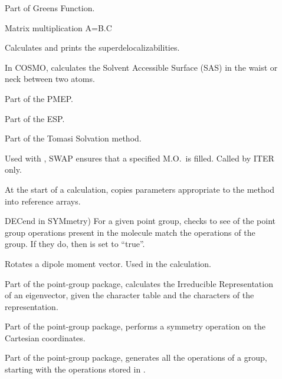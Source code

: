 \begin{description}
\item[] Part of Greens Function.

\item[] Matrix multiplication A=B.C

\item[] Calculates and prints the superdelocalizabilities.

\item[] In COSMO, calculates the Solvent Accessible Surface (SAS)
in the waist or neck between two atoms.

\item[] Part of the PMEP.

\item[] Part of the ESP.

\item[] Part of the Tomasi Solvation method.

\item[] Used with , SWAP ensures that a specified 
M.O.\ is filled. Called by ITER only.

\item[] At the start of a calculation,  copies
parameters appropriate to the method into reference arrays.

\item[] DECend in SYMmetry)  For a given point group,
 checks to see of the point group operations present in the
molecule match the operations of the group.  If they do, then  is
set to ``true''.

\item[] Rotates a dipole moment vector.  Used in the 
 calculation.

\item[] Part of the point-group package,  calculates
 the  Irreducible Representation of an eigenvector, given the character table
 and the characters of the representation.

\item[] Part of the point-group package,   performs a
 symmetry operation on the Cartesian coordinates.

\item[] Part of the point-group package,   generates all
 the operations of a group, starting with the operations stored in
 .


\end{description}
